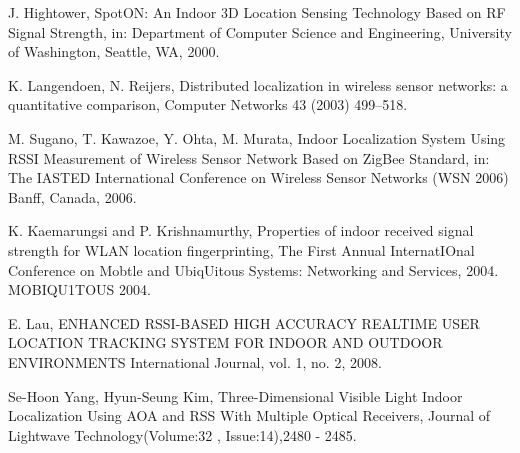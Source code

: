 \documentclass[conference]{IEEEtran}
\begin{document}
\begin{thebibliography}{1}
J. Hightower, SpotON: An Indoor 3D Location Sensing Technology Based on RF
Signal Strength, in: Department of Computer Science and Engineering,
University of Washington, Seattle, WA, 2000.

K. Langendoen, N. Reijers, Distributed localization in wireless sensor networks:
a quantitative comparison, Computer Networks 43 (2003) 499–518.

M. Sugano, T. Kawazoe, Y. Ohta, M. Murata, Indoor Localization System Using
RSSI Measurement of Wireless Sensor Network Based on ZigBee Standard, in:
The IASTED International Conference on Wireless Sensor Networks (WSN
2006) Banff, Canada, 2006.

K. Kaemarungsi and P. Krishnamurthy, Properties of indoor
received signal strength for WLAN location fingerprinting, The First Annual InternatIOnal Conference on Mobtle and UbiqUitous
Systems: Networking and Services, 2004. MOBIQU1TOUS 2004.

E. Lau, ENHANCED RSSI-BASED HIGH ACCURACY REALTIME USER LOCATION TRACKING SYSTEM FOR INDOOR AND OUTDOOR ENVIRONMENTS International Journal, vol. 1, no. 2, 2008. 

Se-Hoon Yang, Hyun-Seung Kim, Three-Dimensional Visible Light Indoor Localization Using AOA and RSS With Multiple Optical Receivers, Journal of Lightwave Technology(Volume:32 ,  Issue:14),2480 - 2485.
\end{thebibliography}






\end{document}
